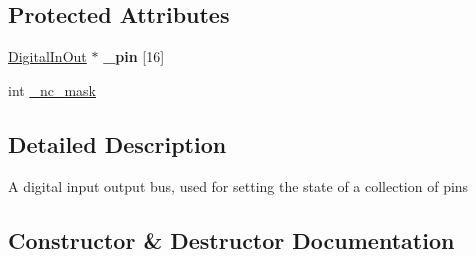 \subsection*{Protected Attributes}
\begin{DoxyCompactItemize}
\item 
\hyperlink{classmbed_1_1_digital_in_out}{Digital\+In\+Out} $\ast$ {\bfseries \+\_\+pin} \mbox{[}16\mbox{]}\hypertarget{classmbed_1_1_bus_in_out_acec107fb8d9edde6b8ac0b189f50f055}{}\label{classmbed_1_1_bus_in_out_acec107fb8d9edde6b8ac0b189f50f055}

\item 
int \hyperlink{classmbed_1_1_bus_in_out_af4a2854a611341b55a9b62075092a53f}{\+\_\+nc\+\_\+mask}
\end{DoxyCompactItemize}


\subsection{Detailed Description}
A digital input output bus, used for setting the state of a collection of pins 

\subsection{Constructor \& Destructor Documentation}
